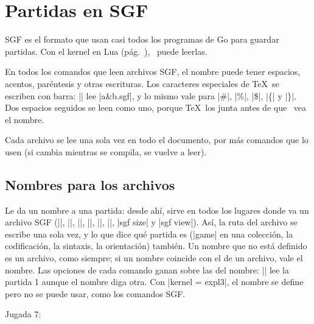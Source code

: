 \section{Partidas en SGF}
\label{subsec:sgf}

SGF es el formato que usan casi todos los programas de Go para guardar partidas. Con el kernel en Lua (pág.~\pageref{subsec:kernel}), \pgfgoname\ puede leerlas.

En todos los comandos que leen archivos SGF, el nombre puede tener espacios, acentos, paréntesis y otras escrituras. Los caracteres especiales de \TeX\ se escriben con barra: || lee |a&b.sgf|, y lo mismo vale para |\#|, |\%|, |\$|, |\{| y |\}|. Dos espacios seguidos se leen como uno, porque \TeX\ los junta antes de que \pgfgoname\ vea el nombre.

Cada archivo se lee una sola vez en todo el documento, por más comandos que lo usen (si cambia mientras se compila, se vuelve a leer).

\subsection{Nombres para los archivos}
\label{subsec:sgfnombres}

\begin{command}{\pgfgodefinesgf{}}
	Le da un nombre a una partida: desde ahí,  sirve en todos los lugares donde va un archivo SGF (|\sgf|, |\sgfinfo|, |\sgfcomment|, |\sgfdiagrams|, |\sgfproblem|, |\sgfanimation|, |sgf size| y |sgf view|). Así, la ruta del archivo se escribe una sola vez, y lo que dice qué partida es (|game| en una colección, la codificación, la sintaxis, la orientación) también. Un nombre que no está definido es un archivo, como siempre; si un nombre coincide con el de un archivo, vale el nombre. Las opciones de cada comando ganan sobre las del nombre: || lee la partida 1 aunque el nombre diga otra. Con |kernel = expl3|, el nombre se define pero no se puede usar, como los comandos SGF.

	\begin{codeexample}[]

		\begin{goban}[sgf size = partida, scale = 0.6]
		\end{goban}

		Jugada 7: 
	\end{codeexample}
\end{command}

